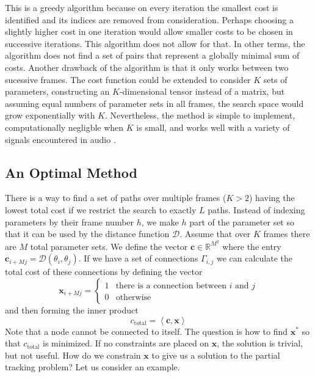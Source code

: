 This is a greedy algorithm because on every iteration the smallest cost is
identified and its indices are removed from consideration. Perhaps choosing a
slightly higher cost in one iteration would allow smaller costs to be chosen in
successive iterations. This algorithm does not allow for that. In other terms,
the algorithm does not find a set of pairs that represent a globally minimal sum of
costs.
Another drawback of the algorithm is that it only works between two sucessive
frames. The cost function could be extended to consider $K$ sets of parameters,
constructing an $K$-dimensional tensor instead of a matrix, but assuming equal
numbers of parameter sets in all frames, the search space would grow
exponentially with $K$. Nevertheless, the method is simple to implement,
computationally negligble when $K$ is small, and works well with a variety of
signals encountered in audio \cite{mcaulay1986speech} \cite{smith1987parshl}.

\subsection{An Optimal Method \label{sec:lppathsearch}}

There is a way to find a set of paths over multiple frames ($K > 2$) having the
lowest total cost if
we restrict the search to exactly $L$ paths. Instead of indexing parameters by
their frame number $h$, we make $h$ part of the parameter set so that it can be
used by the distance function $\mathcal{D}$. Assume that over $K$ frames there
are $M$ total parameter sets. We define the vector $\boldsymbol{c} \in \mathbb{R}^{M^2}$
where the entry $\boldsymbol{c}_{i + Mj} = \mathcal{D} \left( \theta_{i}, \theta_{j}
\right)$. If we have a set of connections $\Gamma_{i,j}$ we can calculate the
total cost of these connections by defining the vector
\[
    \boldsymbol{x}_{i + Mj} = \begin{cases}
        1 & \text{there is a connection between }i\text{ and }j\\
        0 & \text{otherwise}
    \end{cases}
\]
and then forming the inner product
\[
    c_{\text{total}}=\left\langle \boldsymbol{c},\boldsymbol{x} \right\rangle
\]
Note that a node cannot be connected to itself. The question is how to find
$\boldsymbol{x}^{\ast}$ so that $c_{\text{total}}$ is minimized. If no
constraints are placed on $\boldsymbol{x}$, the solution is trivial, but not
useful. How do we constrain $\boldsymbol{x}$ to give us a solution to the
partial tracking problem? Let us consider an example.

